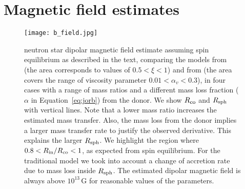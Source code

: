 \documentclass[twocolumn]{aastex631}
\newcommand{\rin}{\ensuremath{R_{\rm in}}}
\newcommand{\rco}{\ensuremath{R_{\rm co}}}
\newcommand{\rsph}{\ensuremath{R_{\rm sph}}}
\begin{document}
\section{Magnetic field estimates}\label{sec:magnetic}
\begin{figure}[ht]
    \centering
    \texttt{[image: b\_field.jpg]}
    \caption{neutron star dipolar magnetic field estimate assuming spin equilibrium as described in the text, comparing the models from \citet{wangLocationInnerRadius1996} (the area corresponds to values of $0.5<\xi<1$) and from \citet{chashkina2017} (the area covers the range of viscosity parameter $0.01<\alpha_v<0.3$), in four cases with a range of mass ratios and a different mass loss fraction ($\alpha$ in Equation~\ref{eq:jorb}) from the donor.
    We show $\rco$ and $\rsph$ with vertical lines.
    Note that a lower mass ratio increases the estimated mass transfer. Also, the mass loss from the donor implies a larger mass transfer rate to justify the observed derivative. This explains the larger $\rsph$. We highlight the region where $0.8 <\rin/\rco < 1$, as expected from spin equilibrium.
    For the traditional model we took into account a change of accretion rate due to mass loss inside $\rsph$.
    The estimated dipolar magnetic field is always above $10^{13}$\,G for reasonable values of the parameters.}
    \label{fig:bfield}
\end{figure}
\end{document}
